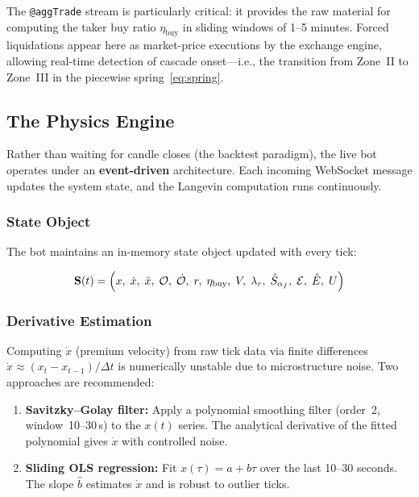 \documentclass[11pt,a4paper]{article}
\newcommand{\af}{\alpha_f}
\newcommand{\OI}{\mathcal{O}}
\begin{document}
The \texttt{@aggTrade} stream is particularly critical: it provides the raw 
material for computing the taker buy ratio $\eta_{\mathrm{buy}}$ in sliding 
windows of 1--5 minutes. Forced liquidations appear here as market-price 
executions by the exchange engine, allowing real-time detection of cascade 
onset---i.e., the transition from Zone~II to Zone~III in the piecewise 
spring~\eqref{eq:spring}.


\subsection{The Physics Engine}

Rather than waiting for candle closes (the backtest paradigm), the live bot 
operates under an \textbf{event-driven} architecture. Each incoming WebSocket 
message updates the system state, and the Langevin computation runs 
continuously.

\subsubsection{State Object}

The bot maintains an in-memory state object updated with every tick:

\begin{equation}
\label{eq:state}
\mathbf{S}(t) = \Bigl(
    x,\; \dot{x},\; \ddot{x},\; \OI,\; \dot{\OI},\; 
    r,\; \eta_{\mathrm{buy}},\; V,\; \lambda_r,\;
    \hat{S}_{\af},\; \mathcal{E},\; \hat{E},\; U
\Bigr)
\end{equation}

\subsubsection{Derivative Estimation}

Computing $\dot{x}$ (premium velocity) from raw tick data via finite 
differences $\dot{x} \approx (x_t - x_{t-1})/\Delta t$ is numerically 
unstable due to microstructure noise. Two approaches are recommended:

\begin{enumerate}[nosep]
    \item \textbf{Savitzky--Golay filter:} Apply a polynomial smoothing filter 
    (order~2, window~10--30\,s) to the $x(t)$ series. The analytical derivative 
    of the fitted polynomial gives $\dot{x}$ with controlled noise.
    
    \item \textbf{Sliding OLS regression:} Fit $x(\tau) = a + b\tau$ over the 
    last 10--30 seconds. The slope $\hat{b}$ estimates $\dot{x}$ and is robust 
    to outlier ticks.
\end{enumerate}
\end{document}

